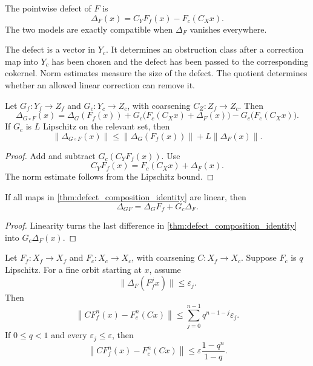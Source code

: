 \begin{definition}\label{def:nonlinear_defect}
The pointwise defect of $F$ is
\[
\Delta_F(x)
=
C_YF_f(x)-F_c(C_Xx).
\]
The two models are exactly compatible when $\Delta_F$ vanishes everywhere.
\end{definition}


The defect is a vector in $Y_c$.  It determines an obstruction class after a correction map into $Y_c$ has been chosen and the defect has been passed to the corresponding cokernel.  Norm estimates measure the size of the defect.  The quotient determines whether an allowed linear correction can remove it.

\begin{theorem}\label{thm:defect_composition_identity}
Let $G_f:Y_f\to Z_f$ and $G_c:Y_c\to Z_c$, with coarsening $C_Z:Z_f\to Z_c$.  Then
\[
\Delta_{G\circ F}(x)
=
\Delta_G(F_f(x))
+
G_c\big(F_c(C_Xx)+\Delta_F(x)\big)
-
G_c\big(F_c(C_Xx)\big).
\]
If $G_c$ is $L$ Lipschitz on the relevant set, then
\[
\|\Delta_{G\circ F}(x)\|
\le
\|\Delta_G(F_f(x))\|
+
L\|\Delta_F(x)\|.
\]
\end{theorem}

\begin{proof}
Add and subtract $G_c(C_YF_f(x))$.  Use
\[
C_YF_f(x)=F_c(C_Xx)+\Delta_F(x).
\]
The norm estimate follows from the Lipschitz bound.
\end{proof}

\begin{corollary}\label{cor:linear_defect_product}
If all maps in \cref{thm:defect_composition_identity} are linear, then
\[
\Delta_{GF}
=
\Delta_G F_f+G_c\Delta_F.
\]
\end{corollary}

\begin{proof}
Linearity turns the last difference in \cref{thm:defect_composition_identity} into $G_c\Delta_F(x)$.
\end{proof}

\begin{theorem}\label{thm:iterated_orbit_defect}
Let $F_f:X_f\to X_f$ and $F_c:X_c\to X_c$, with coarsening $C:X_f\to X_c$.  Suppose $F_c$ is $q$ Lipschitz.  For a fine orbit starting at $x$, assume
\[
\|\Delta_F(F_f^j x)\|\le\varepsilon_j.
\]
Then
\[
\left\|CF_f^n(x)-F_c^n(Cx)\right\|
\le
\sum_{j=0}^{n-1}q^{n-1-j}\varepsilon_j.
\]
If $0\le q<1$ and every $\varepsilon_j\le\varepsilon$, then
\[
\left\|CF_f^n(x)-F_c^n(Cx)\right\|
\le
\varepsilon\frac{1-q^n}{1-q}.
\]
\end{theorem}

